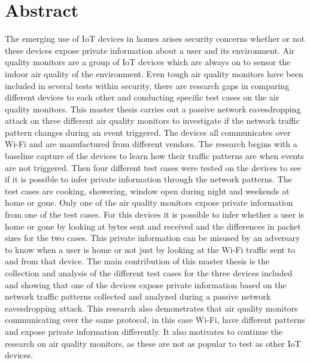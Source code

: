 \chapter*{Abstract}
The emerging use of \gls{IoT} devices in homes arises security concerns whether or not these devices expose private information about a user and its environment. Air quality monitors are a group of \gls{IoT} devices which are always on to sensor the indoor air quality of the environment. Even tough air quality monitors have been included in several tests within security, there are research gaps in comparing different devices to each other and conducting specific test cases on the air quality monitors. This master thesis carries out a passive network eavesdropping attack on three different air quality monitors to investigate if the network traffic pattern changes during an event triggered. The devices all communicates over \gls{Wi-Fi} and are manufactured from different vendors. The research begins with a baseline capture of the devices to learn how their traffic patterns are when events are not triggered. Then four different test cases were tested on the devices to see if it is possible to infer private information through the network patterns. The test cases are cooking, showering, window open during night and weekends at home or gone. Only one of the air quality monitors expose private information from one of the test cases. For this devices it is possible to infer whether a user is home or gone by looking at bytes sent and received and the differences in packet sizes for the two cases. This private information can be misused by an adversary to know when a user is home or not just by looking at the Wi-Fi traffic sent to and from that device. The main contribution of this master thesis is the collection and analysis of the different test cases for the three devices included and showing that one of the devices expose private information based on the network traffic patterns collected and analyzed during a passive network eavesdropping attack. This research also demonstrates that air quality monitors communicating over the same protocol, in this case \gls{Wi-Fi}, have different patterns and expose private information differently. It also motivates to continue the research on air quality monitors, as these are not as popular to test as other \gls{IoT} devices. 